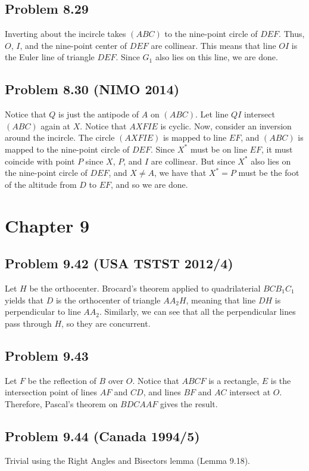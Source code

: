 \documentclass{scrartcl}
\begin{document}
\subsection*{Problem 8.29}
Inverting about the incircle takes $(ABC)$ to the nine-point circle of $DEF$. Thus, $O$, $I$, and the nine-point
center of $DEF$ are collinear. This means that line $OI$ is the Euler line of triangle $DEF$. Since $G_1$ also
lies on this line, we are done.

\subsection*{Problem 8.30 (NIMO 2014)}
Notice that $Q$ is just the antipode of $A$ on $(ABC)$. Let line $QI$ intersect $(ABC)$ again at $X$. Notice that
$AXFIE$ is cyclic. Now, consider an inversion around the incircle. The circle $(AXFIE)$ is mapped to line $EF$, and
$(ABC)$ is mapped to the nine-point circle of $DEF$. Since $X^*$ must be on line $EF$, it must coincide
with point $P$ since $X$, $P$, and $I$ are collinear. But since $X^*$ also lies on the nine-point circle of $DEF$,
and $X \neq A$, we have that $X^* = P$ must be the foot of the altitude from $D$ to $EF$, and so we are done.
\section*{Chapter 9}
\subsection*{Problem 9.42 (USA TSTST 2012/4)}
Let $H$ be the orthocenter. Brocard's theorem applied to quadrilaterial $BCB_1C_1$ yields that $D$ is the
orthocenter of triangle $AA_2H$, meaning that line $DH$ is perpendicular to line $AA_2$. Similarly, we can see
that all the perpendicular lines pass through $H$, so they are concurrent.
\subsection*{Problem 9.43}
Let $F$ be the reflection of $B$ over $O$. Notice that $ABCF$ is a rectangle, $E$ is the intersection point of lines
$AF$ and $CD$, and lines $BF$ and $AC$ intersect at $O$. Therefore, Pascal's theorem on $BDCAAF$ gives the result.
\subsection*{Problem 9.44 (Canada 1994/5)}
Trivial using the Right Angles and Bisectors lemma (Lemma 9.18).
\end{document}
